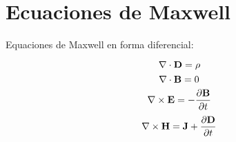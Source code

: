 \section{Ecuaciones de Maxwell}

{\sc Equaciones de Maxwell en forma diferencial:}

$$ \nabla\cdot{\bf D} = \rho $$
$$ \nabla\cdot{\bf B} = 0 $$
$$ \nabla\times{\bf E} = - {{\partial{\bf B}}\over{\partial t}} $$
$$ \nabla\times{\bf H} = {\bf J} + {{\partial{\bf D}}\over{\partial t}} $$
